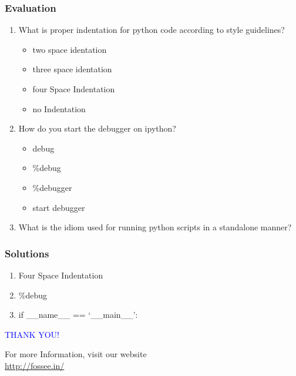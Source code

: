 \documentclass[presentation]{beamer}
\begin{document}
\begin{frame}
\frametitle{Evaluation}
\label{sec-17}


\begin{enumerate}
\item What is proper indentation for python code according to style guidelines?
\begin{itemize}
\item two space identation
\item three space identation
\item four Space Indentation
\item no Indentation
\end{itemize}
\vspace{3pt}
\item How do you start the debugger on ipython?
\begin{itemize}
\item debug
\item \%debug
\item \%debugger
\item start debugger
\end{itemize}
\vspace{3pt}
\item What is the idiom used for running python scripts in a standalone manner?
\end{enumerate}
\end{frame}
\begin{frame}
\frametitle{Solutions}
\label{sec-18}


\begin{enumerate}
\item Four Space Indentation
\vspace{12pt}
\item \%debug
\vspace{12pt}
\item if \_\_name\_\_ == `\_\_main\_\_':
\end{enumerate}
\end{frame}
\begin{frame}

  \begin{block}{}
  \begin{center}
  \textcolor{blue}{\Large THANK YOU!} 
  \end{center}
  \end{block}
\begin{block}{}
  \begin{center}
    For more Information, visit our website\\
    \url{http://fossee.in/}
  \end{center}  
  \end{block}
\end{frame}
\end{document}
